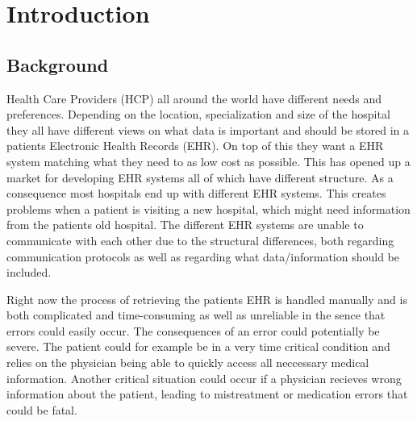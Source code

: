 \documentclass[14pt]{article}
\begin{document}
\section{Introduction}
\label{sec:Introduction}

\subsection{Background}

Health Care Providers (HCP) all around the world have different needs and preferences. Depending on the location, specialization and size of the hospital they all have different views on what data is important and should be stored in a patients Electronic Health Records (EHR). On top of this they want a EHR system matching what they need to as low cost as possible. This has opened up a market for developing EHR systems all of which have different structure. As a consequence most hospitals end up with different EHR systems. This creates problems when a patient is visiting a new hospital, which might need information from the patients old hospital. The different EHR systems are unable to communicate with each other due to the structural differences, both regarding communication protocols as well as regarding what data/information should be included. 

Right now the process of retrieving the patients EHR is handled manually \cite{DataInsp} 
and is both complicated and time-consuming as well as unreliable in the sence that errors could easily occur. The consequences of an error could potentially be severe. The patient could for example be in a very time critical condition and relies on the physician being able to quickly access all neccessary medical information. Another critical situation could occur if a physician recieves wrong information about the patient, leading to mistreatment or medication errors that could be fatal.
\end{document}
